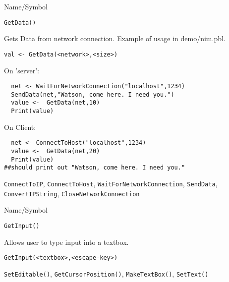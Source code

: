 \begin{desc}{Name/Symbol}
\item[Name/Symbol]	\verb+GetData()+

\item[Description]	Gets Data from network connection.  Example of
  usage in demo/nim.pbl.

\item[Usage]
\begin{verbatim}
val <- GetData(<network>,<size>)
\end{verbatim}

\item[Example]	

On 'server':
\begin{verbatim}
  net <- WaitForNetworkConnection("localhost",1234)
  SendData(net,"Watson, come here. I need you.")
  value <-  GetData(net,10)
  Print(value)

\end{verbatim}
On Client:
\begin{verbatim}
  net <- ConnectToHost("localhost",1234)
  value <-  GetData(net,20)
  Print(value)
##should print out "Watson, come here. I need you."
\end{verbatim}
\item[See Also]
  \verb+ConnectToIP+, \verb+ConnectToHost+, \verb+WaitForNetworkConnection+,
   \verb+SendData+, \verb+ConvertIPString+, \verb+CloseNetworkConnection+
\end{desc}

\rl


\begin{desc}{Name/Symbol}
\item[Name/Symbol]	\verb+GetInput()+

\item[Description]	Allows user to type input into a textbox.

\item[Usage]
\begin{verbatim}
GetInput(<textbox>,<escape-key>)
\end{verbatim}

\item[Example]	

\item[See Also]	\verb+SetEditable()+, \verb+GetCursorPosition()+, \verb+MakeTextBox()+, \verb+SetText()+
\end{desc}

\rl



